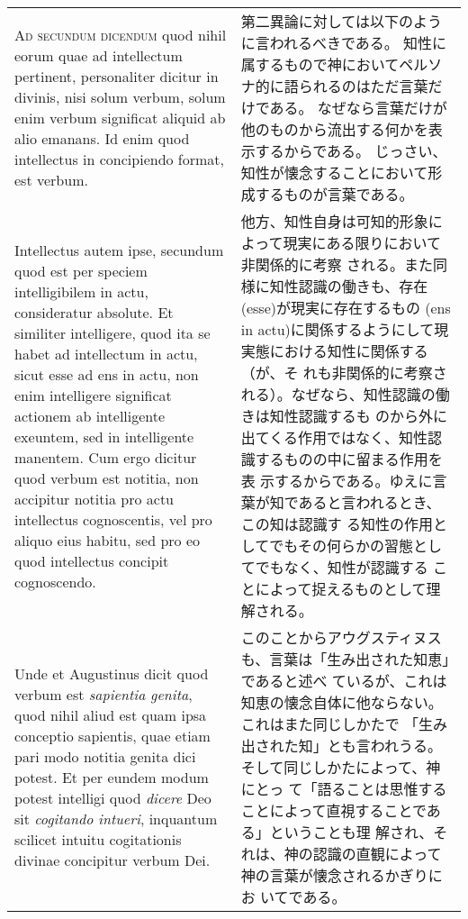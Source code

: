 \documentclass[10pt]{jsarticle} %
\begin{document}
\begin{longtable}{p{21em}p{21em}}
\\




{\scshape Ad secundum dicendum} quod nihil eorum quae ad intellectum pertinent,
 personaliter dicitur in divinis, nisi solum verbum, solum enim verbum
 significat aliquid ab alio emanans. Id enim quod intellectus in
 concipiendo format, est verbum. 

&

第二異論に対しては以下のように言われるべきである。
知性に属するもので神においてペルソナ的に語られるのはただ言葉だけである。
 なぜなら言葉だけが他のものから流出する何かを表示するからである。
じっさい、知性が懐念することにおいて形成するものが言葉である。

\\


Intellectus autem ipse, secundum quod
 est per speciem intelligibilem in actu, consideratur absolute. Et
 similiter intelligere, quod ita se habet ad intellectum in actu,
 sicut esse ad ens in actu, non enim intelligere significat actionem
 ab intelligente exeuntem, sed in intelligente manentem. Cum ergo
 dicitur quod verbum est notitia, non accipitur notitia pro actu
 intellectus cognoscentis, vel pro aliquo eius habitu, sed pro eo quod
 intellectus concipit cognoscendo. 

&

他方、知性自身は可知的形象によって現実にある限りにおいて非関係的に考察
 される。また同様に知性認識の働きも、存在(esse)が現実に存在するもの
 (ens in actu)に関係するようにして現実態における知性に関係する（が、そ
 れも非関係的に考察される）。なぜなら、知性認識の働きは知性認識するも
 のから外に出てくる作用ではなく、知性認識するものの中に留まる作用を表
 示するからである。ゆえに言葉が知であると言われるとき、この知は認識す
 る知性の作用としてでもその何らかの習態としてでもなく、知性が認識する
 ことによって捉えるものとして理解される。

\\



Unde et Augustinus dicit quod
 verbum est {\itshape sapientia genita}, quod nihil aliud est quam ipsa conceptio
 sapientis, quae etiam pari modo notitia genita dici potest. Et per
 eundem modum potest intelligi quod {\itshape dicere} Deo sit {\itshape cogitando intueri},
 inquantum scilicet intuitu cogitationis divinae concipitur verbum
 Dei. 

&

このことからアウグスティヌスも、言葉は「生み出された知恵」であると述べ
 ているが、これは知恵の懐念自体に他ならない。これはまた同じしかたで
 「生み出された知」とも言われうる。そして同じしかたによって、神にとっ
 て「語ることは思惟することによって直視することである」ということも理
 解され、それは、神の認識の直観によって神の言葉が懐念されるかぎりにお
 いてである。


\end{longtable}
\end{document}
